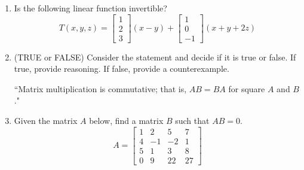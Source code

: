 \documentclass[14pt]{article}
\begin{document}
\begin{enumerate}
\item Is the following linear function invertible?
\[
T(x,y,z) = \left[\begin{array}{c}1\\2\\3\end{array}\right](x-y) + \left[\begin{array}{c}1\\0\\-1\end{array}\right](x+y+2z)
\]

\item (TRUE or FALSE) Consider the statement and decide if it is true or false.  If true, provide reasoning.  If false, provide a counterexample.
\begin{center}
``Matrix multiplication is commutative; that is, $ AB = BA $ for square $ A $ and $ B $."
\end{center}

\item Given the matrix $ A $ below, find a matrix $ B $ such that $ AB=0 $.
\[
A = \left[\begin{array}{cccc}
1 & 2 & 5 & 7 \\
4 & -1 & -2 & 1 \\
5 & 1 & 3 & 8 \\
0 & 9 & 22 & 27
\end{array}\right]
\]





























\end{enumerate}
\end{document}
